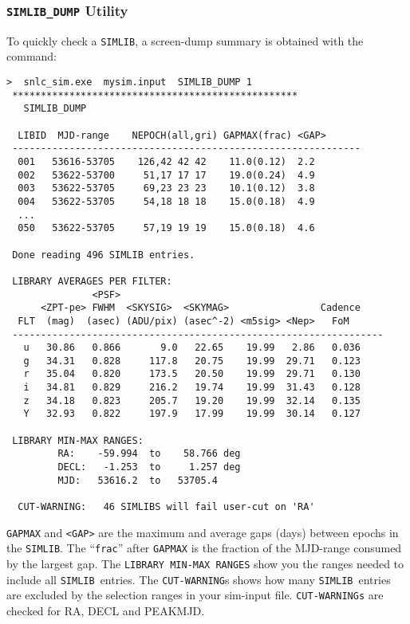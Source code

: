\documentclass[12pt]{article}
\newcommand{\simlib}{{\tt SIMLIB}}
\begin{document}
   \subsubsection{{\tt SIMLIB\_DUMP} Utility }
   \label{sssec:simlib_dump}

To quickly check a \simlib,
a screen-dump summary is obtained 
with the command:
%
\begin{Verbatim}[frame=single]
  >  snlc_sim.exe  mysim.input  SIMLIB_DUMP 1 
 ************************************************** 
   SIMLIB_DUMP  

  LIBID  MJD-range    NEPOCH(all,gri) GAPMAX(frac) <GAP> 
 ------------------------------------------------------------- 
  001   53616-53705    126,42 42 42    11.0(0.12)  2.2 
  002   53622-53700     51,17 17 17    19.0(0.24)  4.9 
  003   53622-53705     69,23 23 23    10.1(0.12)  3.8 
  004   53622-53705     54,18 18 18    15.0(0.18)  4.9 
  ...
  050   53622-53705     57,19 19 19    15.0(0.18)  4.6 

 Done reading 496 SIMLIB entries. 

 LIBRARY AVERAGES PER FILTER:  
               <PSF>  
      <ZPT-pe> FWHM  <SKYSIG>  <SKYMAG>                Cadence 
  FLT  (mag)  (asec) (ADU/pix) (asec^-2) <m5sig> <Nep>   FoM   
 ----------------------------------------------------------------- 
   u   30.86   0.866       9.0   22.65    19.99   2.86   0.036 
   g   34.31   0.828     117.8   20.75    19.99  29.71   0.123 
   r   35.04   0.820     173.5   20.50    19.99  29.71   0.130 
   i   34.81   0.829     216.2   19.74    19.99  31.43   0.128 
   z   34.18   0.823     205.7   19.20    19.99  32.14   0.135 
   Y   32.93   0.822     197.9   17.99    19.99  30.14   0.127 

 LIBRARY MIN-MAX RANGES:  
         RA:    -59.994  to    58.766 deg 
         DECL:   -1.253  to     1.257 deg 
         MJD:   53616.2  to   53705.4 

  CUT-WARNING:   46 SIMLIBS will fail user-cut on 'RA' 
\end{Verbatim}
%
{\tt GAPMAX} and {\tt <GAP>} are the 
maximum and average gaps (days) between epochs in the {\tt SIMLIB}.
The ``{\tt frac}'' after {\tt GAPMAX} is the fraction of the
MJD-range consumed by the largest gap.
The {\tt LIBRARY MIN-MAX RANGES} show you the ranges
needed to include all \simlib\ entries. 
The {\tt CUT-WARNING}s  shows how many \simlib\ entries
are excluded by the selection ranges in your sim-input file.
{\tt CUT-WARNINGs} are checked for RA, DECL and PEAKMJD.
\end{document}
